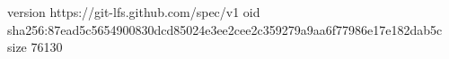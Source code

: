 version https://git-lfs.github.com/spec/v1
oid sha256:87ead5c5654900830dcd85024e3ee2cee2c359279a9aa6f77986e17e182dab5c
size 76130
